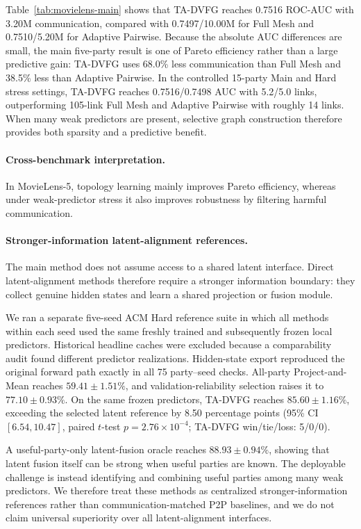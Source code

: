 \documentclass[letterpaper]{article} %
\newcommand{\method}{\textsc{TA-DVFG}}
\begin{document}
Table~\ref{tab:movielens-main} shows that \method{} reaches 0.7516 ROC-AUC with 3.20M communication,
compared with 0.7497/10.00M for Full Mesh and 0.7510/5.20M for Adaptive
Pairwise. Because the absolute AUC differences are small, the main five-party result is one of Pareto efficiency rather than a large predictive gain:
\method{} uses 68.0\% less communication than Full Mesh and 38.5\% less than
Adaptive Pairwise. In the controlled 15-party Main and Hard stress settings,
\method{} reaches 0.7516/0.7498 AUC with 5.2/5.0 links, outperforming 105-link
Full Mesh and Adaptive Pairwise with roughly 14 links. When many weak predictors
are present, selective graph construction therefore provides both sparsity and
a predictive benefit.

\paragraph{Cross-benchmark interpretation.}
In MovieLens-5, topology learning mainly improves Pareto efficiency, whereas
under weak-predictor stress it also improves robustness by filtering harmful
communication.

\paragraph{Stronger-information latent-alignment references.}
The main method does not assume access to a shared latent interface. Direct
latent-alignment methods therefore require a stronger information boundary:
they collect genuine hidden states and learn a shared projection or fusion
module.

We ran a separate five-seed ACM Hard reference suite in which all methods
within each seed used the same freshly trained and subsequently frozen local
predictors. Historical
headline caches were excluded because a comparability audit found different
predictor realizations. Hidden-state export reproduced the original forward path
exactly in all 75 party--seed checks. All-party Project-and-Mean reaches
$59.41\pm1.51\%$, and validation-reliability selection raises it to
$77.10\pm0.93\%$. On the same frozen predictors, \method{} reaches
$85.60\pm1.16\%$, exceeding the selected latent reference by 8.50 percentage
points (95\% CI $[6.54,10.47]$, paired $t$-test
$p=2.76\times10^{-4}$; \method{} win/tie/loss: 5/0/0).

A useful-party-only latent-fusion oracle reaches $88.93\pm0.94\%$, showing that
latent fusion itself can be strong when useful parties are known. The deployable
challenge is instead identifying and combining useful parties among many weak
predictors. We therefore treat these methods as centralized
stronger-information references rather than communication-matched P2P
baselines, and we do not claim universal superiority over all latent-alignment
interfaces.
\end{document}

